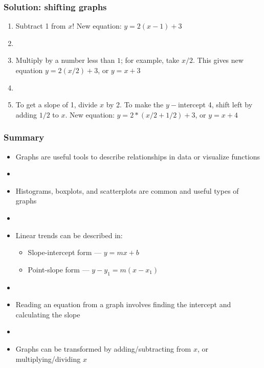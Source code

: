 \documentclass[11pt]{beamer}
\newcommand{\myframe}[1]{\begin{frame} \frametitle{#1}}
\begin{document}
\myframe{Solution: shifting graphs}
\begin{enumerate}
\item Subtract 1 from $x$! New equation: $y = 2(x-1) + 3$
\item[]
\item Multiply by a number less than $1$; for example, take $x/2$. This gives new equation $y = 2(x/2) + 3$, or $y = x + 3$
\item[]
\item To get a slope of 1, divide $x$ by 2. To make the $y-$intercept 4, shift left by adding $1/2$ to $x$. New equation: $y = 2*(x/2 + 1/2) + 3$, or $y = x + 4$
\end{enumerate}
\end{frame}

\myframe{Summary}
\begin{itemize}
\item Graphs are useful tools to describe relationships in data or visualize functions
\item[]
\item Histograms, boxplots, and scatterplots are common and useful types of graphs
\item[]
\item Linear trends can be described in:
\begin{itemize}
\item Slope-intercept form --- $y = mx + b$
\item Point-slope form --- $y - y_1 = m(x - x_1)$
\end{itemize}
\item[]
\item Reading an equation from a graph involves finding the intercept and calculating the slope
\item[]
\item Graphs can be transformed by adding/subtracting from $x$, or multiplying/dividing $x$
\end{itemize}
\end{frame}
\end{document}
